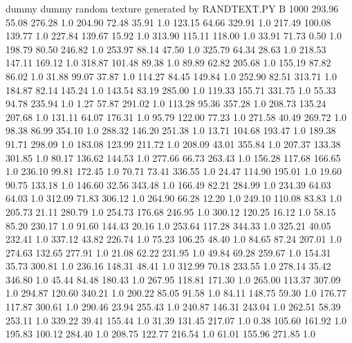 dummy
dummy
random texture generated by RANDTEXT.PY
B   1000
  293.96    55.08   276.28  1.0
  204.90    72.48    35.91  1.0
  123.15    64.66   329.91  1.0
  217.49   100.08   139.77  1.0
  227.84   139.67    15.92  1.0
  313.90   115.11   118.00  1.0
   33.91    71.73     0.50  1.0
  198.79    80.50   246.82  1.0
  253.97    88.14    47.50  1.0
  325.79    64.34    28.63  1.0
  218.53   147.11   169.12  1.0
  318.87   101.48    89.38  1.0
   89.89    62.82   205.68  1.0
  155.19    87.82    86.02  1.0
   31.88    99.07    37.87  1.0
  114.27    84.45   149.84  1.0
  252.90    82.51   313.71  1.0
  184.87    82.14   145.24  1.0
  143.54    83.19   285.00  1.0
  119.33   155.71   331.75  1.0
   55.33    94.78   235.94  1.0
    1.27    57.87   291.02  1.0
  113.28    95.36   357.28  1.0
  208.73   135.24   207.68  1.0
  131.11    64.07   176.31  1.0
   95.79   122.00    77.23  1.0
  271.58    40.49   269.72  1.0
   98.38    86.99   354.10  1.0
  288.32   146.20   251.38  1.0
   13.71   104.68   193.47  1.0
  189.38    91.71   298.09  1.0
  183.08   123.99   211.72  1.0
  208.09    43.01   355.84  1.0
  207.37   133.38   301.85  1.0
   80.17   136.62   144.53  1.0
  277.66    66.73   263.43  1.0
  156.28   117.68   166.65  1.0
  236.10    99.81   172.45  1.0
   70.71    73.41   336.55  1.0
   24.47   114.90   195.01  1.0
   19.60    90.75   133.18  1.0
  146.60    32.56   343.48  1.0
  166.49    82.21   284.99  1.0
  234.39    64.03    64.03  1.0
  312.09    71.83   306.12  1.0
  264.90    66.28    12.20  1.0
  249.10   110.08    83.83  1.0
  205.73    21.11   280.79  1.0
  254.73   176.68   246.95  1.0
  300.12   120.25    16.12  1.0
   58.15    85.20   230.17  1.0
   91.60   144.43    20.16  1.0
  253.64   117.28   344.33  1.0
  325.21    40.05   232.41  1.0
  337.12    43.82   226.74  1.0
   75.23   106.25    48.40  1.0
   84.65    87.24   207.01  1.0
  274.63   132.65   277.91  1.0
   21.08    62.22   231.95  1.0
   49.84    69.28   259.67  1.0
  154.31    35.73   300.81  1.0
  236.16   148.31    48.41  1.0
  312.99    70.18   233.55  1.0
  278.14    35.42   346.80  1.0
   45.44    84.48   180.43  1.0
  267.95   118.81   171.30  1.0
  265.00   113.37   307.09  1.0
  294.87   120.60   340.21  1.0
  200.22    85.05    91.58  1.0
   84.11   148.75    59.30  1.0
  176.77   117.87   300.61  1.0
  290.46    23.94   255.43  1.0
  240.87   146.31   243.04  1.0
  262.51    58.39   253.11  1.0
  339.22    39.41   155.44  1.0
   31.39   131.45   217.07  1.0
    0.38   105.60   161.92  1.0
  195.83   100.12   284.40  1.0
  208.75   122.77   216.54  1.0
   61.01   155.96   271.85  1.0
